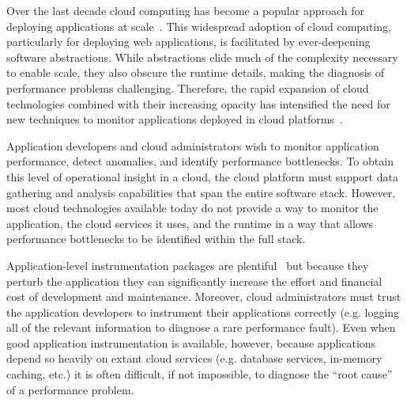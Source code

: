 Over the last decade cloud computing has become a popular approach for
deploying applications at
scale~\cite{Antonopoulos:2010:CCP:1855007,Pinheiro:2014:ACC:2618168.2618188}.
This widespread adoption of cloud computing, particularly for deploying web
applications, is facilitated by ever-deepening software abstractions.  While
abstractions elide much of 
the complexity necessary to enable scale, they also obscure
the runtime details, making the diagnosis of performance
problems challenging.  Therefore, the rapid expansion of cloud technologies
combined with their increasing opacity has intensified the need for new
techniques to monitor applications deployed in cloud
platforms~\cite{DaCunhaRodrigues:2016:MCC:2851613.2851619}. 

Application developers and cloud administrators wish to monitor
application performance, detect anomalies, and identify performance 
bottlenecks. To
obtain this level of operational insight in a cloud,
the cloud platform must support data gathering and analysis capabilities that
span the entire software stack.  However, most cloud technologies
available today do not provide a way to monitor the application, the cloud
services it uses, and the runtime in a way that allows performance bottlenecks
to be identified within the full stack.

Application-level instrumentation packages are
plentiful~\cite{newrelic,datadog,dynatrace} but because they perturb the
application they can significantly increase the
effort and financial cost of development and maintenance.  Moreover, cloud
administrators must trust the application developers to instrument their
applications correctly (e.g. logging all of the relevant 
information to diagnose a rare performance fault).  Even when good application
instrumentation is available, however, because applications depend 
so heavily on
extant cloud services (e.g. database services, in-memory caching, etc.)
it is often difficult, if not impossible, to diagnose
the ``root cause'' of a performance problem.



